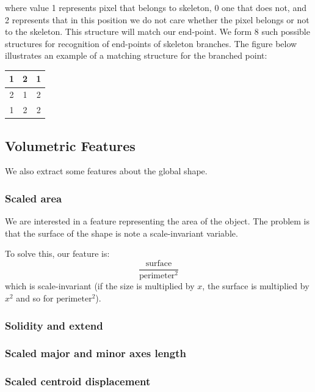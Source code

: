 \documentclass[12pt]{article}
\begin{document}
where value 1 represents pixel that belongs to skeleton, 0 one that does not, and 2 represents that in this position we do not care whether the pixel belongs or not to the skeleton. This structure will match our end-point. We form 8 such possible structures for recognition of end-points of skeleton branches. The figure below illustrates an example of a matching structure for the branched point:
 
\begin{center}
 	\begin{tabular}{| c | c | c |}
 		\hline
			1 & 2 & 1 \\ \hline
			2 & 1 & 2 \\ \hline
			1 & 2 & 2 \\ \hline
	\end{tabular}
\end{center}


\subsection{Volumetric Features}
We also extract some features about the global shape.

\subsubsection{Scaled area}
We are interested in a feature representing the area of the object. The problem is that the surface of the shape is note a scale-invariant variable.

To solve this, our feature is:
$$\frac{\text{surface}}{\text{perimeter}^2}$$
which is scale-invariant (if the size is multiplied by $x$, the surface is multiplied by $x^2$ and so for $\text{perimeter}^2$).

\subsubsection{Solidity and extend}
\subsubsection{Scaled major and minor axes length}
\subsubsection{Scaled centroid displacement}
\end{document}
